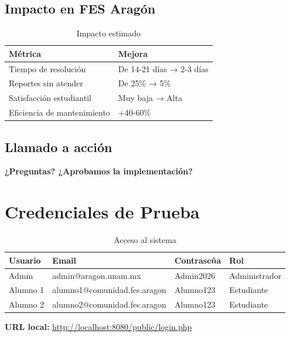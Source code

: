 \documentclass[12pt, a4paper, spanish]{article}
\begin{document}
\subsection{Impacto en FES Aragón}

\begin{table}[H]
\centering
\caption{Impacto estimado}
\small
\begin{tabular}{|l|l|}
\hline
\textbf{Métrica} & \textbf{Mejora} \\
\hline
Tiempo de resolución & De 14-21 días → 2-3 días \\
Reportes sin atender & De 25\% → 5\% \\
Satisfacción estudiantil & Muy baja → Alta \\
Eficiencia de mantenimiento & +40-60\% \\
\hline
\end{tabular}
\end{table}

\subsection{Llamado a acción}

\begin{center}
    \Large\textbf{\textcolor{azulUNAM}{¿Preguntas? ¿Aprobamos la implementación?}}
\end{center}

\newpage

\appendix

\section{Credenciales de Prueba}

\begin{table}[H]
\centering
\caption{Acceso al sistema}
\small
\begin{tabular}{|l|l|l|l|}
\hline
\textbf{Usuario} & \textbf{Email} & \textbf{Contraseña} & \textbf{Rol} \\
\hline
Admin & admin@aragon.unam.mx & Admin2026 & Administrador \\
Alumno 1 & alumno1@comunidad.fes.aragon & Alumno123 & Estudiante \\
Alumno 2 & alumno2@comunidad.fes.aragon & Alumno123 & Estudiante \\
\hline
\end{tabular}
\end{table}

\textbf{URL local:} \url{http://localhost:8080/public/login.php}
\end{document}
